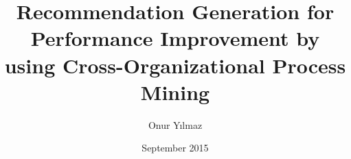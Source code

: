 \documentclass[chaparabic,ceng,ms,12pt,oneandhalf]{metu}
\author{Onur Yılmaz}
\title{Recommendation Generation for Performance Improvement by using Cross-Organizational Process Mining}
\date{September 2015}
\theoremstyle{definition}
\begin{document}
\begin{preliminaries}


\end{preliminaries}
%   
% 
%









%


\appendix

 
%
% 
\end{document}
